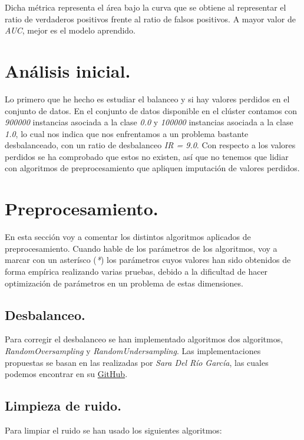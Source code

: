 \documentclass[11pt]{article}
\begin{document}
Dicha métrica representa el área bajo la curva que se obtiene al representar el ratio de verdaderos positivos frente al ratio de falsos positivos. A mayor valor de \textit{AUC}, mejor es el modelo aprendido.

\section{Análisis inicial.}

Lo primero que he hecho es estudiar el balanceo y si hay valores perdidos en el conjunto de datos. En el conjunto de datos disponible en el clúster contamos con \textit{900000} instancias asociada a la clase \textit{0.0} y \textit{100000} instancias asociada a la clase \textit{1.0}, lo cual nos indica que nos enfrentamos a un problema bastante desbalanceado, con un ratio de desbalanceo \textit{IR = 9.0}. Con respecto a los valores perdidos se ha comprobado que estos no existen, así que no tenemos que lidiar con algoritmos de preprocesamiento que apliquen imputación de valores perdidos.

\section{Preprocesamiento.}

En esta sección voy a comentar los distintos algoritmos aplicados de preprocesamiento. Cuando hable de los parámetros de los algoritmos, voy a marcar con un asterísco (\textit{*}) los parámetros cuyos valores han sido obtenidos de forma empírica realizando varias pruebas, debido a la dificultad de hacer optimización de parámetros en un problema de estas dimensiones.

\subsection{Desbalanceo.}

Para corregir el desbalanceo se han implementado algoritmos dos algoritmos, \textit{RandomOversampling} y \textit{RandomUndersampling}. Las implementaciones propuestas se basan en las realizadas por \textit{Sara Del Río García}, las cuales podemos encontrar en su \href{https://github.com/saradelrio/Imb-sampling-ROS_and_RUS}{GitHub}.

\subsection{Limpieza de ruido.}

Para limpiar el ruido se han usado los siguientes algoritmos:
\end{document}
